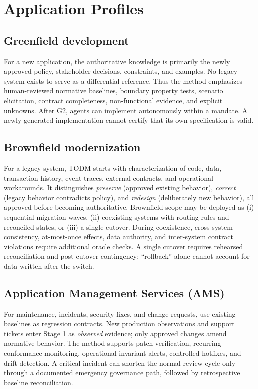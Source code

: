 \documentclass[11pt,a4paper]{article}
\begin{document}
\section{Application Profiles}
\subsection{Greenfield development}
For a new application, the authoritative knowledge is primarily the newly approved policy, stakeholder decisions, constraints, and examples. No legacy system exists to serve as a differential reference. Thus the method emphasizes human-reviewed normative baselines, boundary property tests, scenario elicitation, contract completeness, non-functional evidence, and explicit unknowns. After G2, agents can implement autonomously within a mandate. A newly generated implementation cannot certify that its own specification is valid.

\subsection{Brownfield modernization}
For a legacy system, TODM starts with characterization of code, data, transaction history, event traces, external contracts, and operational workarounds. It distinguishes \emph{preserve} (approved existing behavior), \emph{correct} (legacy behavior contradicts policy), and \emph{redesign} (deliberately new behavior), all approved before becoming authoritative. Brownfield scope may be deployed as (i) sequential migration waves, (ii) coexisting systems with routing rules and reconciled states, or (iii) a single cutover. During coexistence, cross-system consistency, at-most-once effects, data authority, and inter-system contract violations require additional oracle checks. A single cutover requires rehearsed reconciliation and post-cutover contingency: ``rollback'' alone cannot account for data written after the switch.

\subsection{Application Management Services (AMS)}
For maintenance, incidents, security fixes, and change requests, use existing baselines as regression contracts. New production observations and support tickets enter Stage 1 as \emph{observed} evidence; only approved changes amend normative behavior. The method supports patch verification, recurring conformance monitoring, operational invariant alerts, controlled hotfixes, and drift detection. A critical incident can shorten the normal review cycle only through a documented emergency governance path, followed by retrospective baseline reconciliation.
\end{document}
